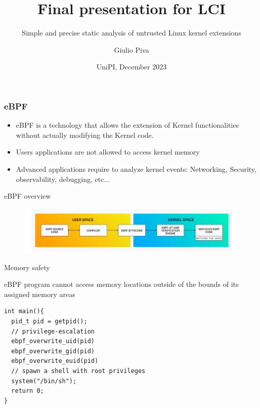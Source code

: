 \documentclass[aspectratio=169]{beamer}
\title[Final presentation for CS4280] %
{Final presentation for LCI}
\subtitle{Simple and precise static analysis of untrusted Linux kernel extensions}
\author[]
{Giulio Piva}
\date[VLC 2021] %
{UniPI, December 2023}
\begin{document}
\frame{\titlepage}
\begin{frame}
  \frametitle{eBPF}

  \begin{figure}
    \centering

  \end{figure}

  \begin{itemize}
    \item eBPF is a technology that allows the extension of Kernel functionalities
          without actually modifying the Kernel code.
    \item Users applications are not allowed to access kernel memory
    \item Advanced applications require to analyze kernel events:
          Networking, Security, observability, debugging, etc...
  \end{itemize}
  \begin{figure}
    \centering
  \end{figure}
\end{frame}


\begin{frame}{eBPF overview}
  \begin{figure}
    \centering
    \includegraphics[width=\textwidth]{images/ebpf-overview.png}
  \end{figure}
\end{frame}

\begin{frame}[fragile]{Memory safety}

  eBPF program cannot access memory locations outside of the bounds of its assigned memory areas
  \begin{lstlisting}[frame=single]
int main(){
  pid_t pid = getpid();
  // privilege-escalation
  ebpf_overwrite_uid(pid)
  ebpf_overwrite_gid(pid)
  ebpf_overwrite_euid(pid)
  // spawn a shell with root privileges
  system("/bin/sh");
  return 0;
}
\end{lstlisting}
\end{frame}
\end{document}
